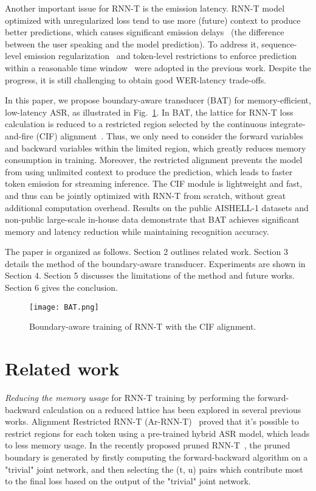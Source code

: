 \documentclass{INTERSPEECH2023}
\begin{document}
Another important issue for RNN-T is the emission latency. RNN-T model optimized with unregularized loss tend to use more (future) context to produce better predictions, which causes significant emission delays~\cite{fastemit} (the difference between the user speaking and the model prediction). To address it, sequence-level emission regularization~\cite{fastemit} and token-level restrictions to enforce prediction within a reasonable time window~\cite{ar-rnnt, EmittingWT} were adopted in the previous work. Despite the progress, it is still challenging to obtain good WER-latency trade-offs.

In this paper, we propose boundary-aware transducer (BAT) for memory-efficient, low-latency ASR, as illustrated in Fig.~\ref{fig:bat}. In BAT, the lattice for RNN-T loss calculation is reduced to a restricted region selected by the continuous integrate-and-fire (CIF) alignment~\cite{cif}. Thus, we only need to consider the forward variables  and backward variables   within the limited region, which greatly reduces memory consumption in training. Moreover, the restricted alignment prevents the model from using unlimited context to produce the prediction, which leads to faster token emission for streaming inference. The CIF module is lightweight and fast, and thus can be jointly optimized with RNN-T from scratch, without great additional computation overhead. Results on the public AISHELL-1 datasets and non-public large-scale in-house data demonstrate that BAT achieves significant memory and latency reduction while maintaining recognition accuracy.

The paper is organized as follows. 
Section 2 outlines related work. Section 3 details the method of the boundary-aware transducer. Experiments are shown in Section 4. Section 5 discusses the limitations of the method and future works. Section 6 gives the conclusion.
\begin{figure}[!t]
  \centering
  \texttt{[image: BAT.png]}
  \caption{Boundary-aware training of RNN-T with the CIF alignment.}
  \label{fig:bat}
\end{figure}
\section{Related work}
\emph{Reducing the memory usage} for RNN-T training by performing the forward-backward calculation on a reduced lattice has been explored in several previous works. Alignment Restricted RNN-T (Ar-RNN-T)~\cite{ar-rnnt} proved that it's possible to restrict regions for each token using a pre-trained hybrid ASR model, which leads to less memory usage. In the recently proposed pruned RNN-T~\cite{kuang2022pruned}, the pruned boundary is generated by firstly computing the forward-backward algorithm on a "trivial" joint network, and then selecting the (t, u) pairs which contribute most to the final loss based on the output of the "trivial" joint network. 
\end{document}

